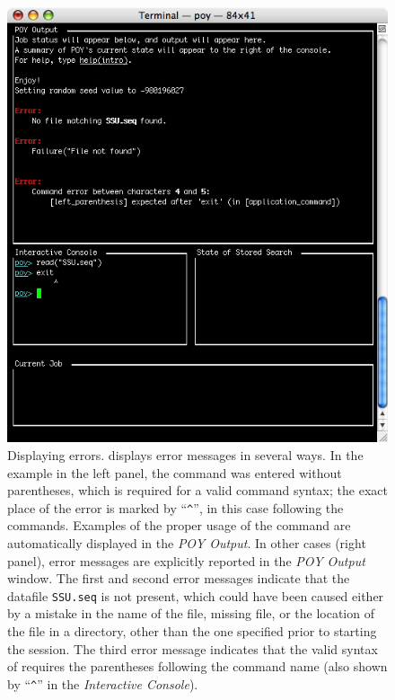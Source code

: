 \begin{figure}
\begin{minipage}[c]{0.48\textwidth}
	   	\includegraphics[width=\textwidth]{figures/figerror2.jpg}
   	\end{minipage}
	
\caption{Displaying errors. \poy displays error messages in several ways. In the example in the left panel, the command  was entered without parentheses, which is required for a  valid \poy command syntax; the exact place of the error is marked by ``\texttt{\^}'', in this case  following the  commands. Examples of the proper usage of the command are automatically displayed in the \emph{POY Output}. In other cases (right panel), error messages are explicitly reported in the \emph{POY Output} window. The first and second error messages indicate that the datafile \texttt{SSU.seq} is not present, which could have been caused either by a mistake in the name of the file, missing file, or the location of the file in a directory, other than the one specified prior to starting the \poy session. The third error message indicates that the valid syntax of  requires the parentheses following the command name (also shown by ``\texttt{\^}'' in  the \emph{Interactive Console}).}
\label{fig:errors}
\end{figure}

